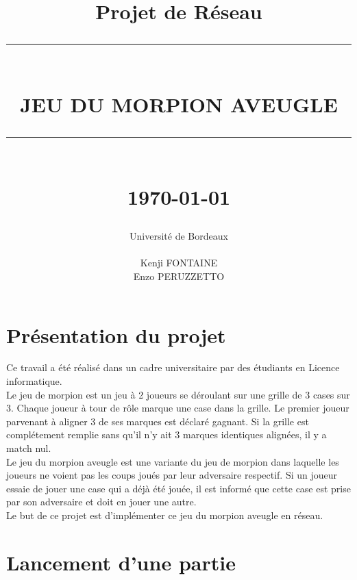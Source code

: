 \documentclass[11pt]{report}
\newcommand{\HRule}[1]{\rule{\linewidth}{#1}}
\begin{document}
\title
{
	\Large{Projet de Réseau}
	\HRule{2pt} \\ [0.5cm]
	\LARGE \textbf{\uppercase{Jeu du Morpion Aveugle}}
	\HRule{2pt} \\ [0.5cm]
	\normalsize \today
}

\date{}

\author
{
	\LARGE{Université de Bordeaux} \\
	\\
    Kenji FONTAINE \\
    Enzo PERUZZETTO \\
}

\maketitle


\tableofcontents


\newpage
\section{Présentation du projet}

Ce travail a été réalisé dans un cadre universitaire par des étudiants en
Licence informatique. \\
Le jeu de morpion est un jeu à 2 joueurs se déroulant sur une grille de
3 cases sur 3. Chaque joueur à tour de rôle marque une case dans la grille.
Le premier joueur parvenant à aligner 3 de ses marques est déclaré gagnant.
Si la grille est complétement remplie sans qu'il n'y ait 3 marques identiques
alignées, il y a match nul. \\
Le jeu du morpion aveugle est une variante du jeu de morpion dans laquelle
les joueurs ne voient pas les coups joués par leur adversaire respectif.
Si un joueur essaie de jouer une case qui a déjà été jouée, il est
informé que cette case est prise par son adversaire et doit en jouer une autre. \\
Le but de ce projet est d'implémenter ce jeu du morpion aveugle en réseau.

\section{Lancement d'une partie}
\end{document}
